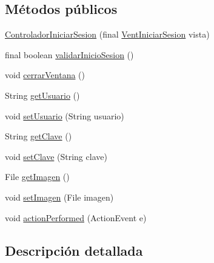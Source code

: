 \subsection*{Métodos públicos}
\begin{DoxyCompactItemize}
\item 
\hyperlink{classcom_1_1ucab_1_1javachat_1_1_cliente_1_1controller_1_1_controlador_iniciar_sesion_ac0ae95fb81e6a3282769c3a48d99340f}{Controlador\-Iniciar\-Sesion} (final \hyperlink{classcom_1_1ucab_1_1javachat_1_1_cliente_1_1view_1_1_vent_iniciar_sesion}{Vent\-Iniciar\-Sesion} vista)
\item 
final boolean \hyperlink{classcom_1_1ucab_1_1javachat_1_1_cliente_1_1controller_1_1_controlador_iniciar_sesion_a0af254dfeeb830b945c72b3f918c4145}{validar\-Inicio\-Sesion} ()
\item 
void \hyperlink{classcom_1_1ucab_1_1javachat_1_1_cliente_1_1controller_1_1_controlador_iniciar_sesion_a3f847e72a97f9af00ae6013eb073a8e2}{cerrar\-Ventana} ()
\item 
String \hyperlink{classcom_1_1ucab_1_1javachat_1_1_cliente_1_1controller_1_1_controlador_iniciar_sesion_ad4d15c39f79ab5c60375ad42fbca1b01}{get\-Usuario} ()
\item 
void \hyperlink{classcom_1_1ucab_1_1javachat_1_1_cliente_1_1controller_1_1_controlador_iniciar_sesion_a93241d6ec2f9d3f2ed60c936d7bcffab}{set\-Usuario} (String usuario)
\item 
String \hyperlink{classcom_1_1ucab_1_1javachat_1_1_cliente_1_1controller_1_1_controlador_iniciar_sesion_a9b1fd5a6d9813bc1f32041210a50876a}{get\-Clave} ()
\item 
void \hyperlink{classcom_1_1ucab_1_1javachat_1_1_cliente_1_1controller_1_1_controlador_iniciar_sesion_a9cf2679039366d1f9e37d2d506dec14c}{set\-Clave} (String clave)
\item 
File \hyperlink{classcom_1_1ucab_1_1javachat_1_1_cliente_1_1controller_1_1_controlador_iniciar_sesion_a5e8b49d814d3693a88e5e431155bb830}{get\-Imagen} ()
\item 
void \hyperlink{classcom_1_1ucab_1_1javachat_1_1_cliente_1_1controller_1_1_controlador_iniciar_sesion_abb99292844ba8b9f1e7379ec01ab9d93}{set\-Imagen} (File imagen)
\item 
void \hyperlink{classcom_1_1ucab_1_1javachat_1_1_cliente_1_1controller_1_1_controlador_iniciar_sesion_a3b51bc4dfb6429cb3d98387b57fc19f3}{action\-Performed} (Action\-Event e)
\end{DoxyCompactItemize}


\subsection{Descripción detallada}


